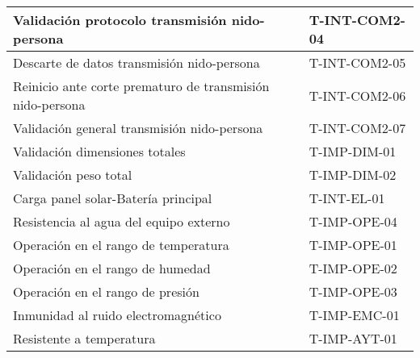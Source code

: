 \begin{table}[H]
\begin{tabular}{|l|l|}
Validación protocolo transmisión nido-persona                                                                        & T-INT-COM2-04                             \\ \hline
Descarte de datos transmisión nido-persona                                                                           & T-INT-COM2-05                             \\ \hline
Reinicio ante corte prematuro de transmisión nido-persona                                                            & T-INT-COM2-06                             \\ \hline
Validación general transmisión nido-persona                                                                          & T-INT-COM2-07                             \\ \hline
Validación dimensiones totales                                                                                       & T-IMP-DIM-01                              \\ \hline
Validación peso total                                                                                                & T-IMP-DIM-02                              \\ \hline
Carga panel solar-Batería principal                                                                                  & T-INT-EL-01                               \\ \hline
Resistencia al agua del equipo externo                                                                               & T-IMP-OPE-04                              \\ \hline
Operación en el rango de temperatura                                                                                 & T-IMP-OPE-01                              \\ \hline
Operación en el rango de humedad                                                                                     & T-IMP-OPE-02                              \\ \hline
Operación en el rango de presión                                                                                     & T-IMP-OPE-03                              \\ \hline
Inmunidad al ruido electromagnético                                                                                  & T-IMP-EMC-01                              \\ \hline
Resistente a temperatura                                                                                             & T-IMP-AYT-01                              \\ \hline

\end{tabular}
\end{table}
